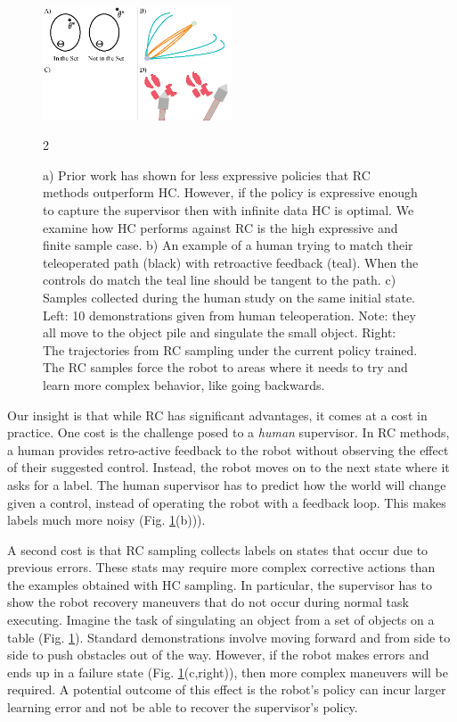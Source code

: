 \documentclass[10pt, conference]{ieeeconf}      %
\begin{document}
\begin{figure}
\center
\includegraphics[width=0.5\textwidth]{f_figs/teaser.eps}
\caption{
    \footnotesize
a) Prior work has shown for less expressive policies that RC methods outperform HC. However, if the policy is expressive enough to capture the supervisor then with infinite data HC is optimal. We examine how HC performs against RC is the high expressive and finite sample case.  b) An example of a human trying to match their teleoperated path (black) with retroactive feedback (teal). When the controls do match the teal line should be tangent to the path.  c) Samples collected during the human study on the same initial state. Left:  10 demonstrations given from human teleoperation. Note: they all move to the object pile and singulate the small object. Right: The trajectories from RC sampling under the current policy trained. The RC samples force the robot to areas where it needs to try and learn more complex behavior, like going backwards. }
\vspace*{-20pt}2
\label{fig:teaser}
\end{figure}



Our insight is that while RC has significant advantages, it comes at a cost in practice. One cost is the challenge posed to a \emph{human} supervisor.  In RC methods, a human provides retro-active feedback to the robot without observing the effect of their suggested control. Instead, the robot moves on to the next state where it asks for a label.  The human supervisor has to predict how the world will change given a control, instead of operating the robot with a feedback loop. This makes labels much more noisy (Fig. \ref{fig:teaser}(b))).

A second cost is that RC sampling collects labels on states that occur due to previous errors.
These stats may require more complex corrective actions than the examples obtained with HC sampling. In particular, the supervisor has to show the robot recovery maneuvers that do not occur during normal task executing. Imagine the task of singulating an object from a set of objects on a table (Fig. \ref{fig:teaser}). Standard demonstrations involve moving forward and from side to side to push obstacles out of the way. However, if the robot makes errors and ends up in a failure state (Fig. \ref{fig:teaser}(c,right)), then more complex maneuvers will be required.  
A potential outcome of this effect is the robot's policy can incur larger learning error and not be able to recover the supervisor's policy.
 
\end{document}
